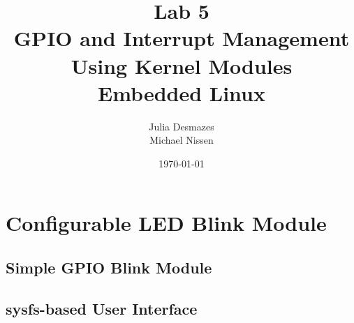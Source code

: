 \documentclass[a4paper,oneside,onecolumn]{article}
\begin{document}
\title{Lab 5 \\ GPIO and Interrupt Management Using Kernel Modules \\ Embedded Linux}
\author{Julia Desmazes \\ Michael Nissen}
\date{\today}
\maketitle
\bigskip

\section{Configurable LED Blink Module}

\subsection{Simple GPIO Blink Module}

\subsection{sysfs-based User Interface}
\end{document}
